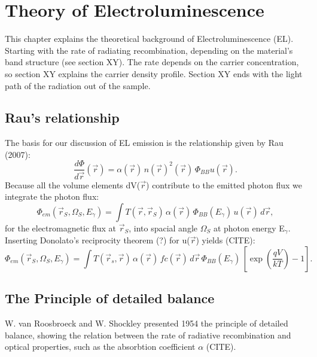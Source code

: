 \chapter{Theory of Electroluminescence}
This chapter explains the theoretical background of Electroluminescence (EL). Starting with the rate of radiating recombination, depending on the material's band structure (see section XY). The rate depends on the carrier concentration, so section XY explains the carrier density profile. Section XY ends with the light path of the radiation out of the sample.\\
\section{Rau's relationship}
The basis for our discussion of EL emission is the relationship given by Rau (2007):
\begin{equation}
	\frac{d\Phi}{d\vec{r}}(\vec{r}) = \alpha(\vec{r})\, n(\vec{r})^2(\vec{r})\, \Phi_{BB} u(\vec{r}). 
\end{equation}
Because all the volume elements dV($\vec{r}$) contribute to the emitted photon flux we integrate the photon flux:
\begin{equation}
	\Phi_{em}(\vec{r}_S, \Omega_S, E_\gamma) = \int T(\vec{r}, \vec{r}_S)\, \alpha(\vec{r})\,\Phi_{BB}(E_\gamma)\,u(\vec{r})\, d\vec{r},
\end{equation}
for the electromagnetic flux at $\vec{r}_S$, into spacial angle $\Omega_S$ at photon energy E$_\gamma$. Inserting Donolato's reciprocity theorem (?) for u($\vec{r}$) yields (CITE):
\begin{equation}
	\Phi_{em} (\vec{r}_S, \Omega_S, E_\gamma) = \int T(\vec{r}_s, \vec{r})\,\alpha(\vec{r})\,fc(\vec{r})\,d\vec{r}\,\Phi_{BB}(E_\gamma)\,\left[\exp\left(\frac{qV}{kT}\right)-1\right].
\end{equation}

\section{The Principle of detailed balance}
W. van Roosbroeck and W. Shockley presented 1954 the principle of detailed balance, showing the relation between the rate of radiative recombination and optical properties, such as the absorbtion coefficient $\alpha$ (CITE).

